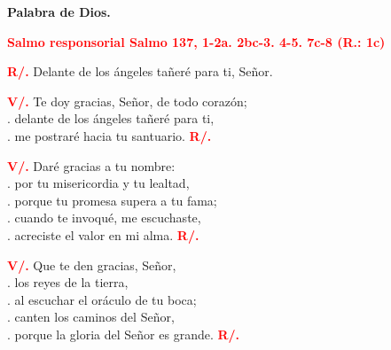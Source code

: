 \documentclass[12pt, letterpaper]{report}
\begin{document}
    {\bfseries Palabra de Dios.}

    \Large {\bfseries \textcolor{red}{Salmo responsorial \hspace{1cm} Salmo 137, 1-2a. 2bc-3. 4-5. 7c-8 (R.: 1c)}}

    \Large {\bfseries \textcolor{red}{R/.}} \hspace{1cm} Delante de los \'angeles ta\~ner\'e para ti, Se\~nor.

    {\bfseries \textcolor{red}{V/.}} \hspace{1cm} Te doy gracias, Se\~nor, de todo coraz\'on;\\
    . \hspace{2.5cm} delante de los \'angeles ta\~ner\'e para ti,\\
    . \hspace{2.5cm} me postrar\'e hacia tu santuario.
    \hspace{1cm} {\bfseries \textcolor{red}{R/.}}

    {\bfseries \textcolor{red}{V/.}} \hspace{1cm} Dar\'e gracias a tu nombre:\\
    . \hspace{2.5cm} por tu misericordia y tu lealtad,\\
    . \hspace{2.5cm} porque tu promesa supera a tu fama;\\
    . \hspace{2.5cm} cuando te invoqu\'e, me escuchaste,\\
    . \hspace{2.5cm} acreciste el valor en mi alma.
    \hspace{1cm} {\bfseries \textcolor{red}{R/.}}

    {\bfseries \textcolor{red}{V/.}} \hspace{1cm} Que te den gracias, Se\~nor,\\
    . \hspace{2.5cm} los reyes de la tierra,\\
    . \hspace{2.5cm} al escuchar el or\'aculo de tu boca;\\
    . \hspace{2.5cm} canten los caminos del Se\~nor,\\
    . \hspace{2.5cm} porque la gloria del Se\~nor es grande.
    \hspace{1cm} {\bfseries \textcolor{red}{R/.}}
\end{document}
